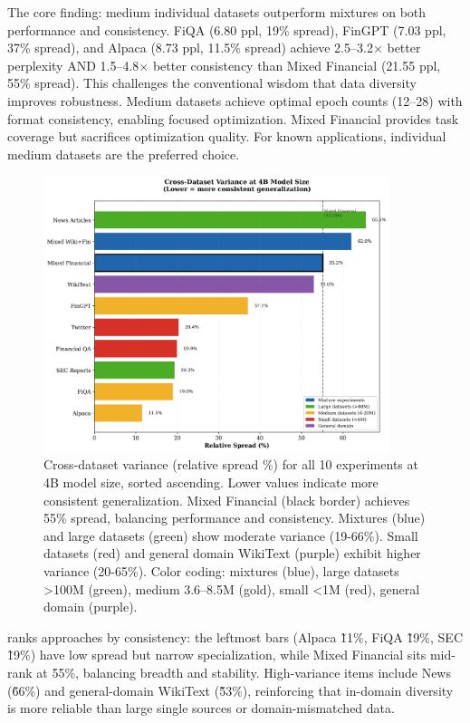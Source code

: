The core finding: medium individual datasets outperform mixtures on both performance and consistency. FiQA (6.80 ppl, 19\% spread), FinGPT (7.03 ppl, 37\% spread), and Alpaca (8.73 ppl, 11.5\% spread) achieve 2.5–3.2$\times$ better perplexity AND 1.5–4.8$\times$ better consistency than Mixed Financial (21.55 ppl, 55\% spread). This challenges the conventional wisdom that data diversity improves robustness. Medium datasets achieve optimal epoch counts (12–28) with format consistency, enabling focused optimization. Mixed Financial provides task coverage but sacrifices optimization quality. For known applications, individual medium datasets are the preferred choice.

\begin{figure}[htbp]
\centering
\includegraphics[width=0.9\textwidth]{figures/bar_variance.png}
\caption[Cross-Dataset Variance Comparison]{Cross-dataset variance (relative spread \%) for all 10 experiments at 4B model size, sorted ascending. Lower values indicate more consistent generalization. Mixed Financial (black border) achieves 55\% spread, balancing performance and consistency. Mixtures (blue) and large datasets (green) show moderate variance (19-66\%). Small datasets (red) and general domain WikiText (purple) exhibit higher variance (20-65\%). Color coding: mixtures (blue), large datasets >100M (green), medium 3.6–8.5M (gold), small <1M (red), general domain (purple).}
\label{fig:bar_variance}
\end{figure}

 ranks approaches by consistency: the leftmost bars (Alpaca \~11\%, FiQA \~19\%, SEC \~19\%) have low spread but narrow specialization, while Mixed Financial sits mid-rank at 55\%, balancing breadth and stability. High-variance items include News (\~66\%) and general-domain WikiText (\~53\%), reinforcing that in-domain diversity is more reliable than large single sources or domain-mismatched data.

